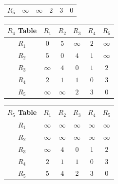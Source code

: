 \documentclass[en]{university}
\begin{document}
\begin{minipage}[t]{0.5\textwidth}
\begin{table}[H]
\begin{tabular}{c|*5c}
            $R_5$       & $\infty$ & $\infty$ & $2$      & $3$      & $0$
        \end{tabular}
        \begin{tabular}{c|*5c}
            $R_4$ Table & $R_1$    & $R_2$    & $R_3$    & $R_4$ & $R_5$    \\
            \hline
            $R_1$       & $0$      & $5$      & $\infty$ & $2$   & $\infty$ \\
            $R_2$       & $5$      & $0$      & $4$      & $1$   & $\infty$ \\
            $R_3$       & $\infty$ & $4$      & $0$      & $1$   & $2$      \\
            $R_4$       & $2$      & $1$      & $1$      & $0$   & $3$      \\
            $R_5$       & $\infty$ & $\infty$ & $2$      & $3$   & $0$
        \end{tabular}
        \begin{tabular}{c|*5c}
            $R_5$ Table & $R_1$    & $R_2$    & $R_3$    & $R_4$    & $R_5$    \\
            \hline
            $R_1$       & $\infty$ & $\infty$ & $\infty$ & $\infty$ & $\infty$ \\
            $R_2$       & $\infty$ & $\infty$ & $\infty$ & $\infty$ & $\infty$ \\
            $R_3$       & $\infty$ & $4$      & $0$      & $1$      & $2$      \\
            $R_4$       & $2$      & $1$      & $1$      & $0$      & $3$      \\
            $R_5$       & $5$      & $4$      & $2$      & $3$      & $0$
        \end{tabular}
    \end{table}
\end{minipage}
\end{document}
